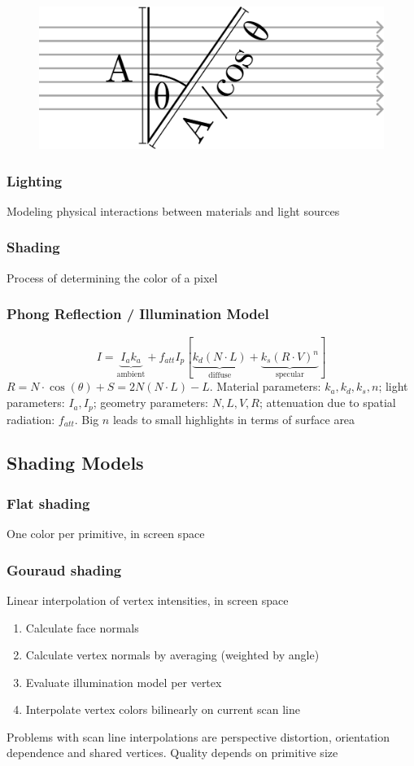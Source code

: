 \documentclass[a4paper,10pt]{article}
\begin{document}
\begin{figure}[ht]
    \centering
    \includegraphics[width=0.4\linewidth]{lamberts-law.png}
\end{figure}
\subsubsection{Lighting} Modeling physical interactions between materials and light sources
\subsubsection{Shading} Process of determining the color of a pixel
\subsubsection{Phong Reflection / Illumination Model} 
\[
    I = \underbrace{I_a k_a}_{\text{ambient}} + f_{att} I_p [\underbrace{k_d(N\cdot L)}_{\text{diffuse}} + \underbrace{k_s(R\cdot V)^n}_{\text{specular}}]
\] 
\( R = N \cdot \cos (\theta) + S = 2N(N\cdot L) - L \).
Material parameters: \( k_a, k_d, k_s, n \);
light parameters: \( I_a, I_p \);
geometry parameters: \( N, L, V, R \); attenuation due to spatial radiation: \( f_{att} \). Big \( n \) leads to small highlights in terms of surface area

\subsection{Shading Models}
\subsubsection{Flat shading} One color per primitive, in screen space
\subsubsection{Gouraud shading} Linear interpolation of vertex intensities, in screen space
\begin{enumerate}
    \item Calculate face normals
    \item Calculate vertex normals by averaging (weighted by angle)
    \item Evaluate illumination model per vertex
    \item Interpolate vertex colors bilinearly on current scan line
\end{enumerate}
Problems with scan line interpolations are perspective distortion, orientation dependence and shared vertices. Quality depends on primitive size
\end{document}
